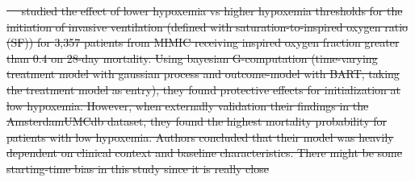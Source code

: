 \documentclass[10pt,letterpaper]{article}
\providecommand{\DIFdeltex}[1]{{\protect\color{red}\sout{#1}}}                      %
\providecommand{\DIFdelbegin}{} %
\providecommand{\DIFdelend}{} %
\providecommand{\DIFdel}[1]{\texorpdfstring{\DIFdeltex{#1}}{}} %
\newcommand{\DIFscaledelfig}{0.5}
\newlength{\DIFdelgraphicswidth} %
\newlength{\DIFdelgraphicsheight} %
\newcommand{\DIFdelincludegraphics}[2][]{%
\sbox{\DIFdelgraphicsbox}{\DIFOincludegraphics[#1]{#2}}%
\settoboxwidth{\DIFdelgraphicswidth}{\DIFdelgraphicsbox} %
\settoboxtotalheight{\DIFdelgraphicsheight}{\DIFdelgraphicsbox} %
\scalebox{\DIFscaledelfig}{%
\parbox[b]{\DIFdelgraphicswidth}{\usebox{\DIFdelgraphicsbox}\\[-\baselineskip] \rule{\DIFdelgraphicswidth}{0em}}\llap{\resizebox{\DIFdelgraphicswidth}{\DIFdelgraphicsheight}{%
\setlength{\unitlength}{\DIFdelgraphicswidth}%
\begin{picture}(1,1)%
\thicklines\linethickness{2pt} %
{\color[rgb]{1,0,0}\put(0,0){\framebox(1,1){}}}%
{\color[rgb]{1,0,0}\put(0,0){\line( 1,1){1}}}%
{\color[rgb]{1,0,0}\put(0,1){\line(1,-1){1}}}%
\end{picture}%
}\hspace*{3pt}}} %
} %
\DeclareRobustCommand{\DIFdelbegin}{\DIFOdelbegin \let\includegraphics\DIFdelincludegraphics} %
\DeclareRobustCommand{\DIFdelend}{\DIFOaddend \let\includegraphics\DIFOincludegraphics} %
\begin{document}
\DIFdelbegin %
\DIFdel{\mbox{%
\cite{yarnell2023oxygenation} }\hskip0pt%
studied the effect of \textcolor{I}{lower hypoxemia} vs \textcolor{C}{higher
        hypoxemia thresholds for the initiation of invasive ventilation} (defined with saturation-to-inspired oxygen ratio (SF)) for
        \textcolor{P}{3,357 patients from MIMIC receiving inspired oxygen fraction greater than 0.4} on \textcolor{O}{28-day
          mortality}. Using bayesian G-computation (time-varying treatment model with
        gaussian process and outcome-model with BART, taking the treatment model as
        entry), they found protective effects for initialization at low hypoxemia.
        However, when externally validation their findings in the AmsterdamUMCdb dataset,
        they found the highest mortality probability for patients with low hypoxemia.
        Authors concluded that their model was heavily dependent on clinical context
        and baseline characteristics. There might be some starting-time bias in this study since it is really close
}\DIFdelend %
\end{document}

